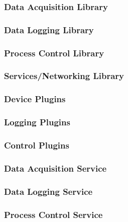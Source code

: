 \documentclass[11pt]{article}
\begin{document}
        

      \subsubsection{Data Acquisition Library}\label{sec:req-srs-daq}

      \subsubsection{Data Logging Library}\label{sec:req-srs-log}

      \subsubsection{Process Control Library}\label{sec:req-srs-ctl}

      \subsubsection{Services/Networking Library}\label{sec:req-srs-net}

      \subsubsection{Device Plugins}\label{sec:req-srs-dev-plug}

      \subsubsection{Logging Plugins}\label{sec:req-srs-log-plug}

      \subsubsection{Control Plugins}\label{sec:req-srs-ctl-plug}

      \subsubsection{Data Acquisition Service}\label{sec:req-srs-daqd}

      \subsubsection{Data Logging Service}\label{sec:req-srs-logd}

      \subsubsection{Process Control Service}\label{sec:req-srs-ctld}
\end{document}
